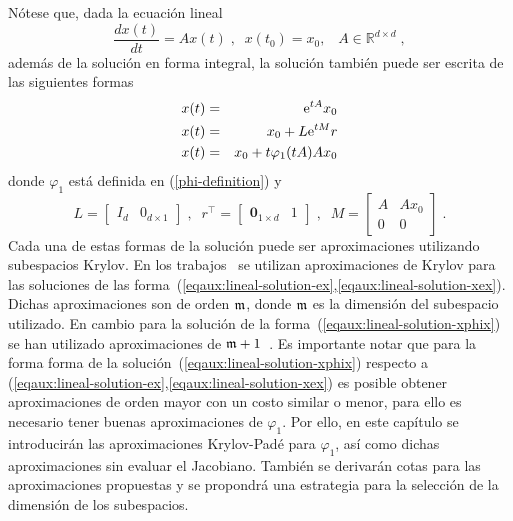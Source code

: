 Nótese que, dada la ecuación lineal
\begin{equation*}
	\frac{dx(t)}{dt}=Ax(t)\;,\;\; x(t_0)=x_0,\;\;\; A\in\mathbb{R}^{d\times d}\;,
\end{equation*}
además de la solución en forma integral, la solución también puede ser escrita de las siguientes formas
\begin{eqnarray}
	x(t) & = & \mathrm{e}^{tA}x_0 \label{eqaux:lineal-solution-ex} \\
	x(t) & = & x_0 + L\mathrm{e}^{tM}r \label{eqaux:lineal-solution-xex} \\
	x(t) & = & x_0 + t\varphi_1(tA)Ax_0 \label{eqaux:lineal-solution-xphix}
\end{eqnarray}
donde $\varphi_1$ está definida en (\ref{phi-definition}) y
\begin{equation*}
	L=\left[ \begin{array}{ll} I_{d} & 0_{d\times 1}\end{array} \right] \;,\;\;
	r^{\intercal }=\left[ \begin{array}{ll} \mathbf{0}_{1\times d} & 1\end{array}\right] \;,\;\;
	M=\left[
	\begin{array}{cc}
	A & Ax_0 \\
	0 & 0
	\end{array}
	\right]\;.
\end{equation*}
Cada una de estas formas de la solución puede ser aproximaciones utilizando subespacios Krylov. En los trabajos~\cite{Saad92,jimenez2012convergence} se utilizan aproximaciones de Krylov para las soluciones de las forma~(\ref{eqaux:lineal-solution-ex},\ref{eqaux:lineal-solution-xex}). Dichas aproximaciones son de orden $\mathfrak{m}$, donde $\mathfrak{m}$ es la dimensión del subespacio utilizado. En cambio para la solución de la forma~(\ref{eqaux:lineal-solution-xphix}) se han utilizado aproximaciones de $\mathfrak{m}+1$~\cite{sidje1998expokit,hochbruck1998exponential}. Es importante notar que para la forma forma de la solución~(\ref{eqaux:lineal-solution-xphix}) respecto a (\ref{eqaux:lineal-solution-ex},\ref{eqaux:lineal-solution-xex}) es posible obtener aproximaciones de orden mayor con un costo similar o menor, para ello es necesario tener buenas aproximaciones de $\varphi_1$. Por ello, en este capítulo se introducirán las aproximaciones Krylov-Padé para $\varphi_1$, así como dichas aproximaciones sin evaluar el Jacobiano. También se derivarán cotas para las aproximaciones propuestas y se propondrá una estrategia para la selección de la dimensión de los subespacios.

